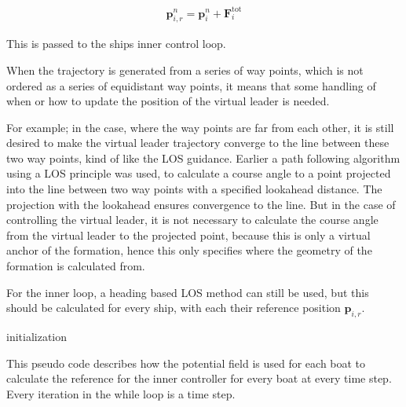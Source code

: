 \begin{align}
	\mathbf{p}_{i,r}^n = \mathbf{p}_i^n + \mathbf{F}_i ^\text{tot}
\end{align}

This is passed to the ships inner control loop.

When the trajectory is generated from a series of way points, which is
not ordered as a series of equidistant way points, it means that some
handling of when or how to update the position of the virtual leader
is needed.

For example; in the case, where the way points are far from each
other, it is still desired to make the virtual leader trajectory
converge to the line between these two way points, kind of like the
\ac{LOS} guidance. Earlier a path following algorithm using a \ac{LOS}
principle was used, to calculate a course angle to a point projected
into the line between two way points with a specified lookahead
distance. The projection with the lookahead ensures convergence to the
line. But in the case of controlling the virtual leader, it is not
necessary to calculate the course angle from the virtual leader to the
projected point, because this is only a virtual anchor of the
formation, hence this only specifies where the geometry of the
formation is calculated from. 

For the inner loop, a heading based \ac{LOS} method can still be used,
but this should be calculated for every ship, with each their
reference position $\mathbf{p}_{i,r}$.

\begin{algorithm}[H]
	initialization\;
	\caption{This pseudo code describes how the potential field is used
	for each boat to calculate the reference for the inner controller
	for every boat at every time step. Every iteration in the while loop
	is a time step.\vspace{6pt}}
	\label{al:potfield}
\end{algorithm}


